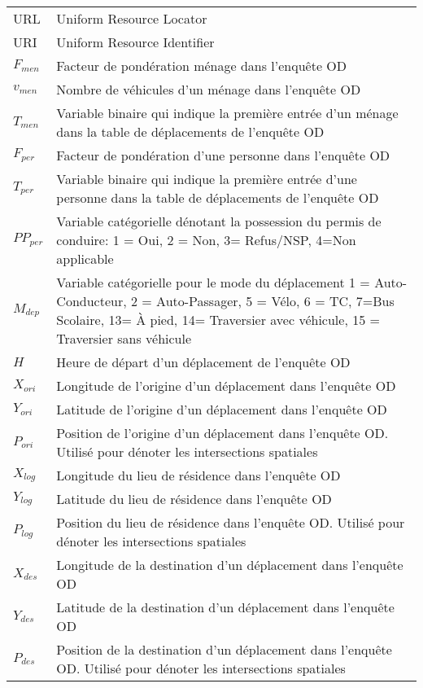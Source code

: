\begin{longtable}{lp{5in}}
URL     & Uniform Resource Locator                                                      \\
URI     & Uniform Resource Identifier                                                   \\
$F_{men}$ & Facteur de pondération ménage dans l'enquête OD                             \\
$v_{men}$ & Nombre de véhicules d'un ménage dans l'enquête OD                           \\
$T_{men}$ & Variable binaire qui indique la première entrée d'un ménage dans la table de déplacements de l'enquête OD \\
$F_{per}$ & Facteur de pondération d'une personne dans l'enquête OD                     \\
$T_{per}$ & Variable binaire qui indique la première entrée d'une personne dans la table de déplacements de l'enquête OD\\
$PP_{per}$ & Variable catégorielle dénotant la possession du permis de conduire: 1 = Oui, 2 = Non, 3= Refus/NSP, 4=Non applicable\\
$M_{dep}$ & Variable catégorielle pour le mode du déplacement 1 = Auto-Conducteur, 2 = Auto-Passager, 5 = Vélo, 6 = TC, 7=Bus Scolaire, 13= À pied, 14= Traversier avec véhicule, 15 = Traversier sans véhicule\\
$H$ & Heure de départ d'un déplacement de l'enquête OD \\ 
$X_{ori}$ & Longitude de l'origine d'un déplacement dans l'enquête OD \\
$Y_{ori}$ & Latitude de l'origine d'un déplacement dans l'enquête OD\\
$P_{ori}$ & Position de l'origine d'un déplacement dans l'enquête OD. Utilisé pour dénoter les intersections spatiales \\ 
$X_{log}$ & Longitude du lieu de résidence dans l'enquête OD\\
$Y_{log}$ & Latitude du lieu de résidence dans l'enquête OD\\
$P_{log}$ & Position du lieu de résidence dans l'enquête OD. Utilisé pour dénoter les intersections spatiales \\
$X_{des}$ & Longitude de la destination d'un déplacement dans l'enquête OD\\
$Y_{des}$ & Latitude de la destination d'un déplacement dans l'enquête OD\\
$P_{des}$ & Position de la destination d'un déplacement dans l'enquête OD. Utilisé pour dénoter les intersections spatiales \\

\end{longtable}
